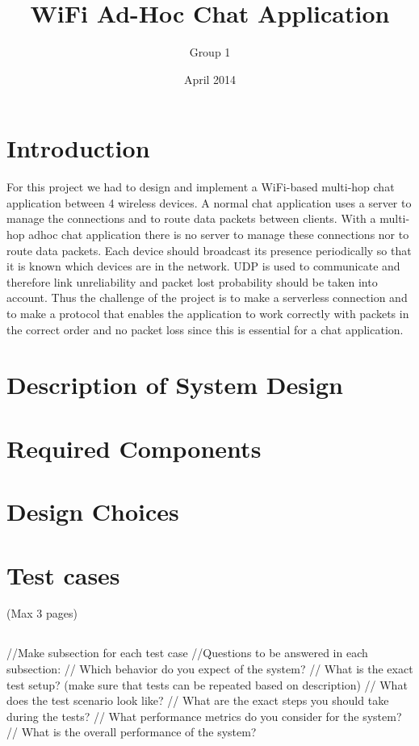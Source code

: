 \documentclass{article}
\title{WiFi Ad-Hoc Chat Application}
\author{Group 1}
\date{April 2014}
\begin{document}
\maketitle

\tableofcontents

\section{Introduction}
For this project we had to design and implement a WiFi-based multi-hop chat application between 4 wireless devices. A normal chat application uses a server to manage the connections and to route data packets between clients. With a multi-hop adhoc chat  application there is no server to manage these connections nor to route data packets. Each device should broadcast its presence periodically so that it is known which devices are in the network. UDP is used to communicate and therefore link unreliability and packet lost probability should be taken into account. Thus the challenge of the project is to make a serverless connection and to make a protocol that enables the application to work correctly with packets in the correct order and no packet loss since this is essential for a chat application.

\section{Description of System Design}

\section{Required Components}

\section{Design Choices}

\section{Test cases} (Max 3 pages)
\subsection{} //Make subsection for each test case
//Questions to be answered in each subsection:
// Which behavior do you expect of the system?
// What is the exact test setup? (make sure that tests can be repeated based on description)
// What does the test scenario look like?
// What are the exact steps you should take during the tests?
// What performance metrics do you consider for the system?
// What is the overall performance of the system?
\end{document}
